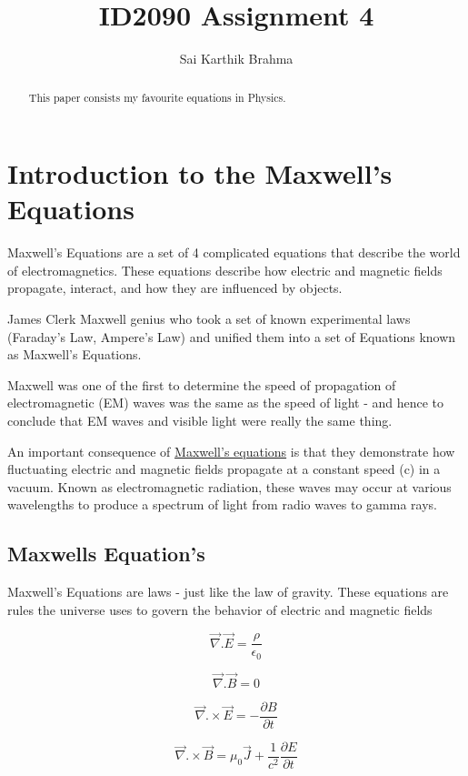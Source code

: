 \documentclass{article}
\begin{document}
\author{Sai Karthik Brahma}

\title{ID2090 Assignment 4}

\maketitle

\begin{abstract}
This paper consists my favourite equations in Physics.
\end{abstract}
\tableofcontents


\section{Introduction to the Maxwell's Equations}

Maxwell's Equations are a set of 4 complicated equations that describe the world of electromagnetics. These equations describe how electric and magnetic fields propagate, interact, and how they are influenced by objects.

James Clerk Maxwell genius who took a set of known experimental laws (Faraday's Law, Ampere's Law) and unified them into a set of Equations known as Maxwell's Equations. 

Maxwell was one of the first to determine the speed of propagation of electromagnetic (EM) waves was the same as the speed of light - and hence to conclude that EM waves and visible light were really the same thing.

An important consequence of \href{https://en.wikipedia.org/wiki/Maxwell's_equations} {Maxwell's equations} is that they demonstrate how fluctuating electric and magnetic fields propagate at a constant speed (c) in a vacuum. Known as electromagnetic radiation, these waves may occur at various wavelengths to produce a spectrum of light from radio waves to gamma rays.


\subsection{Maxwells Equation's}

Maxwell's Equations are laws - just like the law of gravity. These equations are rules the universe uses to govern the behavior of electric and magnetic fields


\begin{equation}
\Vec{\nabla}.\Vec{E} = \dfrac{\rho}{\epsilon_0}
\end{equation}

\begin{equation}
\Vec{\nabla}.\Vec{B} = 0
\end{equation}

\begin{equation}
\vec{\nabla}.\times\vec{E} = -\dfrac{\partial B}{\partial t}
\end{equation}

\begin{equation}
\vec{\nabla}.\times\vec{B} = \mu_0\vec{J} + \dfrac{1}{c^2}\dfrac{\partial E}{\partial t}
\end{equation}
\end{document}
